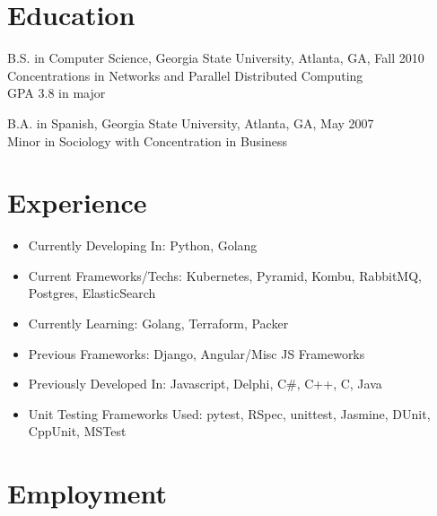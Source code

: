 \documentclass[margin]{res}
\begin{document}

\address{217 Rockyford Rd NE \\ Atlanta, GA 30317 \\
        (678) 773-1545 }

\begin{resume}

\section{Education}
    B.S. in Computer Science, Georgia State University, Atlanta, GA, Fall 2010  \\
    Concentrations in Networks and Parallel Distributed Computing \\
    GPA 3.8 in major

    B.A. in Spanish, Georgia State University, Atlanta, GA, May 2007 \\
    Minor in Sociology with Concentration in Business


\section{Experience}
    \begin{itemize} \itemsep -2pt  %
        \item Currently Developing In: Python, Golang
        \item Current Frameworks/Techs: Kubernetes, Pyramid, Kombu, RabbitMQ, Postgres, ElasticSearch
        \item Currently Learning: Golang, Terraform, Packer
        \item Previous Frameworks: Django, Angular/Misc JS Frameworks
        \item Previously Developed In: Javascript, Delphi, C\#, C++, C, Java
        \item Unit Testing Frameworks Used: pytest, RSpec, unittest, Jasmine, DUnit, CppUnit, MSTest
    \end{itemize}

\section{Employment}


\end{resume}
\end{document}
